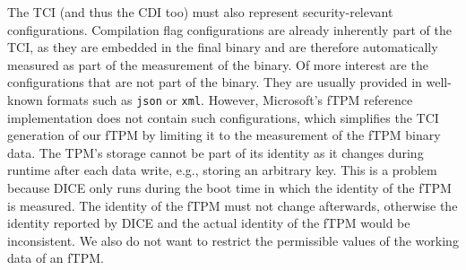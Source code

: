 The TCI (and thus the CDI too) must also represent security-relevant configurations.
Compilation flag configurations are already inherently part of the TCI, as they are embedded in the final binary and are therefore automatically measured as part of the measurement of the binary.
Of more interest are the configurations that are not part of the binary.
They are usually provided in well-known formats such as \texttt{json} or \texttt{xml}.
However, Microsoft's fTPM reference implementation does not contain such configurations, which simplifies the TCI generation of our fTPM by limiting it to the measurement of the fTPM binary data.
The TPM's storage cannot be part of its identity as it changes during runtime after each data write, e.g., storing an arbitrary key.
This is a problem because DICE only runs during the boot time in which the identity of the fTPM is measured.
The identity of the fTPM must not change afterwards, otherwise the identity reported by DICE and the actual identity of the fTPM would be inconsistent.
We also do not want to restrict the permissible values of the working data of an fTPM.


